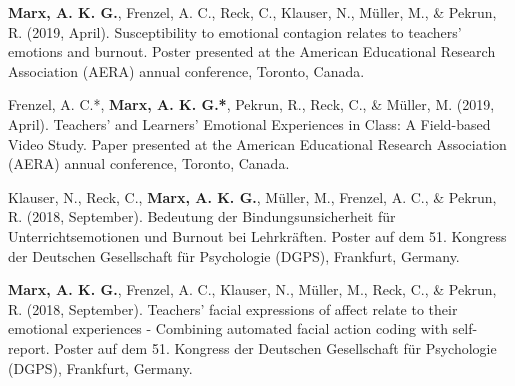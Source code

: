 \documentclass[letterpaper]{article}
\renewenvironment{itemize}{ %
  \begin{list}{}{ %
    \setlength{\leftmargin}{2.5em} %
  }
}{
  \end{list}
}
\begin{document}
\begin{itemize}
\item {\bf Marx, A. K. G.}, Frenzel, A. C., Reck, C., Klauser, N., Müller, M., \& Pekrun, R. (2019, April). Susceptibility to emotional contagion relates to teachers' emotions and burnout. Poster presented at the American Educational Research Association (AERA) annual conference, Toronto, Canada.
\item Frenzel, A. C.*, {\bf Marx, A. K. G.*}, Pekrun, R., Reck, C., \& Müller, M. (2019, April). Teachers’ and Learners’ Emotional Experiences in Class: A Field-based Video Study. Paper presented at the American Educational Research Association (AERA) annual conference, Toronto, Canada.
\item Klauser, N., Reck, C., {\bf Marx, A. K. G.}, Müller, M., Frenzel, A. C., \& Pekrun, R. (2018, September). Bedeutung der Bindungsunsicherheit für Unterrichtsemotionen und Burnout bei Lehrkräften. Poster auf dem 51. Kongress der Deutschen Gesellschaft für Psychologie (DGPS), Frankfurt, Germany.
\item {\bf Marx, A. K. G.}, Frenzel, A. C., Klauser, N., Müller, M., Reck, C., \& Pekrun, R. (2018, September). Teachers' facial expressions of affect relate to their emotional experiences - Combining automated facial action coding with self-report. Poster auf dem 51. Kongress der Deutschen Gesellschaft für Psychologie (DGPS), Frankfurt, Germany.
\item{}
\end{itemize}
\end{document}
